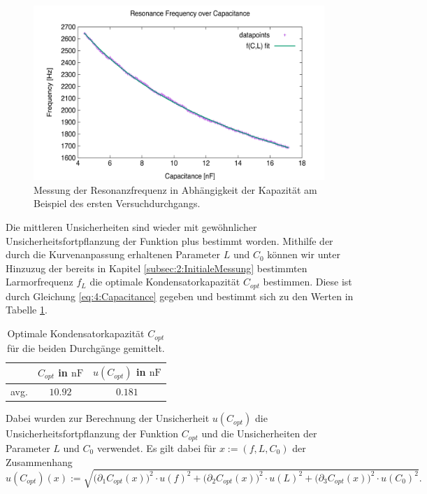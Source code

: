 \documentclass{article}
\begin{document}
        \begin{figure}[H]
            \centering
            \includegraphics[width=11cm]{../Bilddateien/4/Messung1_Resonance_Freq_vs_Capacitance.png}
            \caption{Messung der Resonanzfrequenz in Abhängigkeit der Kapazität am Beispiel des ersten Versuchdurchgangs.}
            \label{fig:4:LCRResonance}
        \end{figure}
        Die mittleren Unsicherheiten sind wieder mit gewöhnlicher Unsicherheitsfortpflanzung der Funktion plus bestimmt worden. Mithilfe der durch die Kurvenanpassung erhaltenen Parameter $L$ und $C_0$ können wir unter Hinzuzug der bereits in Kapitel \ref{subsec:2:InitialeMessung} bestimmten Larmorfrequenz $f_L$ die optimale Kondensatorkapazität $C_{opt}$ bestimmen. Diese ist durch Gleichung \eqref{eq:4:Capacitance} gegeben und bestimmt sich zu den Werten in Tabelle \ref{tab:4:OptimalCapacitance}.
        \begin{table}[H]
            \centering
            \begin{tabular}{c|cc}
                \hline
                 & $C_{opt}$ in $\si{\nano\farad}$ & $u(C_{opt})$ in $\si{\nano\farad}$ \\
                \hline\hline
                avg. & $10.92$ & $0.181$\\
                \hline
            \end{tabular}
            \caption{Optimale Kondensatorkapazität $C_{opt}$ für die beiden Durchgänge gemittelt.}
            \label{tab:4:OptimalCapacitance}
        \end{table}
        Dabei wurden zur Berechnung der Unsicherheit $u(C_{opt})$ die Unsicherheitsfortpflanzung der Funktion $C_{opt}$ und die Unsicherheiten der Parameter $L$ und $C_0$ verwendet. Es gilt dabei für $x:=(f,L,C_0)$ der Zusammenhang
        \[
            u(C_{opt})(x) := \sqrt{\bigl(\partial_1C_{opt}(x)\bigr)^2\cdot u(f)^2 + \bigl(\partial_2C_{opt}(x)\bigr)^2\cdot u(L)^2 + \bigl(\partial_3C_{opt}(x)\bigr)^2\cdot u(C_0)^2}.
        \]
        
\end{document}
